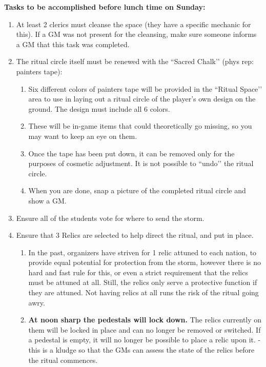 \documentclass[green]{GL2020}
\begin{document}
\textbf{Tasks to be accomplished before lunch time on Sunday:}
\begin{enumerate}
  \item At least 2 clerics must cleanse the space (they have a specific mechanic for this). If a GM was not present for the cleansing, make sure someone informs a GM that this task was completed.
  \item The ritual circle itself must be renewed with the ``Sacred Chalk’’ (phys rep: painters tape):
  \begin{enumerate}
    \item Six different colors of painters tape will be provided in the ``Ritual Space’’ area to use in laying out a ritual circle of the player’s own design on the ground. The design must include all 6 colors.
    \item These will be in-game items that could theoretically go missing, so you may want to keep an eye on them.
    \item Once the tape has been put down, it can be removed only for the purposes of cosmetic adjustment. It is not possible to ``undo’’ the ritual circle.
    \item When you are done, snap a picture of the completed ritual circle and show a GM.
  \end{enumerate}
  \item Ensure all of the students vote for where to send the storm.
  \item Ensure that 3 Relics are selected to help direct the ritual, and put in place.
  \begin{enumerate}
    \item In the past, organizers have striven for 1 relic attuned to each nation, to provide equal potential for protection from the storm, however there is no hard and fast rule for this, or even a strict requirement that the relics must be attuned at all. Still, the relics only serve a protective function if they are attuned. Not having relics at all runs the risk of the ritual going awry.
    \item \textbf{At noon sharp the pedestals will lock down.} The relics currently on them will be locked in place and can no longer be removed or switched. If a pedestal is empty, it will no longer be possible to place a relic upon it. - this is a kludge so that the GMs can assess the state of the relics before the ritual commences.
  \end{enumerate}
\end{enumerate}
\end{document}
